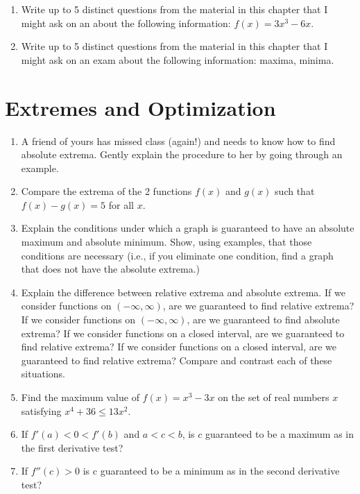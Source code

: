 \begin{enumerate}
\item  Write up to 5 distinct questions from the material in this chapter that I might ask on an  about the following information: $f(x) = 3x^3 - 6x$.

\item  Write up to 5 distinct questions from the material in this chapter that I might ask on an exam about the following information:  maxima, minima.

\end{enumerate}\section{Extremes and Optimization}\begin{enumerate}

\item  A friend of yours has missed class (again!) and needs to know how to find absolute extrema.  Gently explain the procedure to her by going through an example.  

\item  Compare the extrema of the 2 functions $f(x)$ and $g(x)$ such that $f(x) - g(x) = 5$ for all $x$. 

\item  Explain the conditions under which a graph is guaranteed to have an absolute maximum and absolute minimum.  Show, using examples, that those conditions are necessary (i.e., if you eliminate one condition, find a graph that does not have the absolute extrema.)

\item  Explain the difference between relative extrema and absolute extrema.  If we consider functions on $(-\infty, \infty)$, are we guaranteed to find relative extrema? If we consider functions on $(-\infty, \infty)$, are we guaranteed to find absolute extrema? If we consider functions on a closed interval, are we guaranteed to find relative extrema? If we consider functions on a closed interval, are we guaranteed to find relative extrema?  Compare and contrast each of these situations.

\item  Find the maximum value of $f(x) = x^3  - 3x$ on the set of real numbers $x$ satisfying $x^4  + 36 \le 13x^2 .$

\item  If $f'(a) < 0 < f'(b)$ and $a < c < b$, is $c$ guaranteed to be a maximum as in the first derivative test?

\item  If $f''(c) > 0$ is c guaranteed to be a minimum as in the second derivative test?


\end{enumerate}
